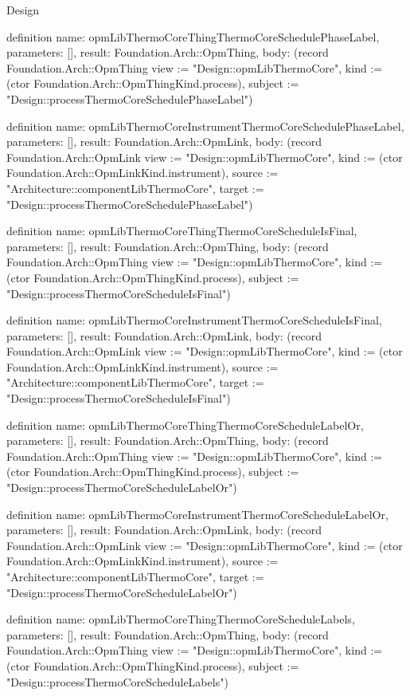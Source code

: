 \begin{lexlean}{Design}
\begin{semanticmodule}
definition{
  name: opmLibThermoCoreThingThermoCoreSchedulePhaseLabel,
  parameters: [],
  result: Foundation.Arch::OpmThing,
  body: (record Foundation.Arch::OpmThing {view := "Design::opmLibThermoCore", kind := (ctor Foundation.Arch::OpmThingKind.process), subject := "Design::processThermoCoreSchedulePhaseLabel"})
}

definition{
  name: opmLibThermoCoreInstrumentThermoCoreSchedulePhaseLabel,
  parameters: [],
  result: Foundation.Arch::OpmLink,
  body: (record Foundation.Arch::OpmLink {view := "Design::opmLibThermoCore", kind := (ctor Foundation.Arch::OpmLinkKind.instrument), source := "Architecture::componentLibThermoCore", target := "Design::processThermoCoreSchedulePhaseLabel"})
}

definition{
  name: opmLibThermoCoreThingThermoCoreScheduleIsFinal,
  parameters: [],
  result: Foundation.Arch::OpmThing,
  body: (record Foundation.Arch::OpmThing {view := "Design::opmLibThermoCore", kind := (ctor Foundation.Arch::OpmThingKind.process), subject := "Design::processThermoCoreScheduleIsFinal"})
}

definition{
  name: opmLibThermoCoreInstrumentThermoCoreScheduleIsFinal,
  parameters: [],
  result: Foundation.Arch::OpmLink,
  body: (record Foundation.Arch::OpmLink {view := "Design::opmLibThermoCore", kind := (ctor Foundation.Arch::OpmLinkKind.instrument), source := "Architecture::componentLibThermoCore", target := "Design::processThermoCoreScheduleIsFinal"})
}

definition{
  name: opmLibThermoCoreThingThermoCoreScheduleLabelOr,
  parameters: [],
  result: Foundation.Arch::OpmThing,
  body: (record Foundation.Arch::OpmThing {view := "Design::opmLibThermoCore", kind := (ctor Foundation.Arch::OpmThingKind.process), subject := "Design::processThermoCoreScheduleLabelOr"})
}

definition{
  name: opmLibThermoCoreInstrumentThermoCoreScheduleLabelOr,
  parameters: [],
  result: Foundation.Arch::OpmLink,
  body: (record Foundation.Arch::OpmLink {view := "Design::opmLibThermoCore", kind := (ctor Foundation.Arch::OpmLinkKind.instrument), source := "Architecture::componentLibThermoCore", target := "Design::processThermoCoreScheduleLabelOr"})
}

definition{
  name: opmLibThermoCoreThingThermoCoreScheduleLabels,
  parameters: [],
  result: Foundation.Arch::OpmThing,
  body: (record Foundation.Arch::OpmThing {view := "Design::opmLibThermoCore", kind := (ctor Foundation.Arch::OpmThingKind.process), subject := "Design::processThermoCoreScheduleLabels"})
}


\end{semanticmodule}
\end{lexlean}
